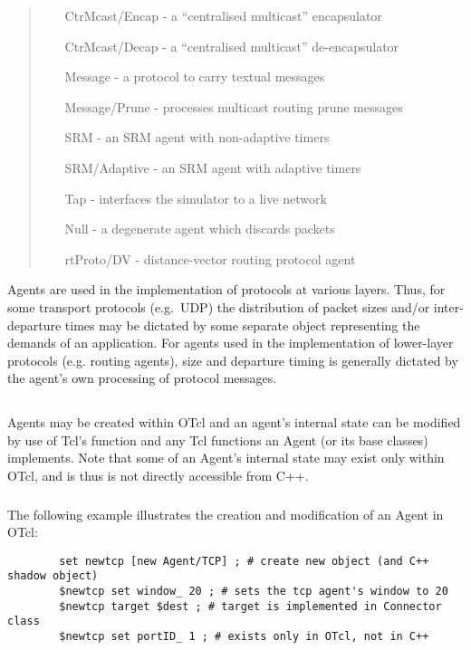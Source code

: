 \begin{quote}
\begin{itemize}
	\item[CtrMcast/Encap] - a ``centralised multicast'' encapsulator
	\item[CtrMcast/Decap] - a ``centralised multicast'' de-encapsulator
	\item[Message] - a protocol to carry textual messages
	\item[Message/Prune] - processes multicast routing prune messages

	\item[SRM] - an SRM agent with non-adaptive timers
	\item[SRM/Adaptive] - an SRM agent with adaptive timers

	\item[Tap] - interfaces the simulator to a live network

	\item[Null] - a degenerate agent which discards packets

	\item[rtProto/DV] - distance-vector routing protocol agent
\end{itemize}
\end{quote}
Agents are used in the implementation of protocols at various layers.
Thus, for some transport protocols (e.g.~UDP) the distribution
of packet sizes and/or inter-departure times
may be dictated by some separate
object representing the demands of an application.
For agents used in the implementation of lower-layer protocols
(e.g. routing agents), size and departure timing is generally dictated
by the agent's own processing of protocol messages.

\subsection{}

Agents may be created within OTcl and an agent's internal
state can be modified by use of Tcl's  function and
any Tcl functions an Agent (or its base classes) implements.
Note that some of an Agent's internal state may exist
only within OTcl, and is thus is not directly accessible from C++.

\subsubsection{}

The following example illustrates the creation and modification
of an Agent in OTcl:
\begin{small}
\begin{verbatim}
        set newtcp [new Agent/TCP] ; # create new object (and C++ shadow object)
        $newtcp set window_ 20 ; # sets the tcp agent's window to 20
        $newtcp target $dest ; # target is implemented in Connector class
        $newtcp set portID_ 1 ; # exists only in OTcl, not in C++
\end{verbatim}
\end{small}

